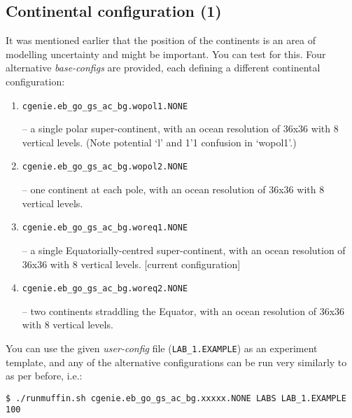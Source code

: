 \documentclass[11pt,fleqn]{book} %
\begin{document}

\subsection{Continental configuration (1)}

It was mentioned earlier that the position of the continents is an area of modelling uncertainty and might be important. You can test for this. Four alternative \textit{base-configs} are provided, each defining a different continental configuration:

\vspace{1mm}
\begin{enumerate}[noitemsep]
\setlength{\itemindent}{.2in}
\item 
\begin{verbatim}
cgenie.eb_go_gs_ac_bg.wopol1.NONE
\end{verbatim}
 – a single polar super-continent, with an ocean resolution of 36x36 with 8 vertical levels. (Note potential ‘l’ and 1’1 confusion in ‘wopol1’.)
\item
\begin{verbatim}
cgenie.eb_go_gs_ac_bg.wopol2.NONE
\end{verbatim}
  – one continent at each pole, with an ocean resolution of 36x36 with 8 vertical levels.
\item
\begin{verbatim}
cgenie.eb_go_gs_ac_bg.woreq1.NONE
\end{verbatim}
  – a single Equatorially-centred super-continent, with an ocean resolution of 36x36 with 8 vertical levels. [current configuration]
\item 
\begin{verbatim}
cgenie.eb_go_gs_ac_bg.woreq2.NONE
\end{verbatim}
 – two continents straddling the Equator, with an ocean resolution of 36x36 with 8 vertical levels.
\end{enumerate}
\vspace{1mm}
   
You can use the given \textit{user-config} file (\texttt{LAB\_1.EXAMPLE}) as an experiment template, and any of the alternative configurations can be run very similarly to as per before, i.e.:

\vspace{-2mm}
\begin{verbatim}
$ ./runmuffin.sh cgenie.eb_go_gs_ac_bg.xxxxx.NONE LABS LAB_1.EXAMPLE 100
\end{verbatim}
\vspace{-2mm}
\end{document}
